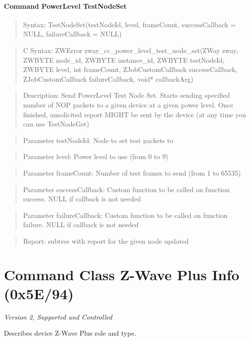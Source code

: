 \paragraph{Command PowerLevel TestNodeSet}
\begin{quote}Syntax: TestNodeSet(testNodeId, level, frameCount, successCallback = NULL, failureCallback = NULL)\end{quote}
\begin{quote}C Syntax: ZWError zway\_cc\_power\_level\_test\_node\_set(ZWay zway, ZWBYTE node\_id, ZWBYTE instance\_id, ZWBYTE testNodeId, ZWBYTE level, int frameCount, ZJobCustomCallback successCallback, ZJobCustomCallback failureCallback, void* callbackArg)\end{quote}
\begin{quote}Description: Send PowerLevel Test Node Set. Starts sending specified number of NOP packets to a given device at a given power level. Once finished, unsolicited report MIGHT be sent by the device (at any time you can use TestNodeGet)\end{quote}
\begin{quote}Parameter testNodeId: Node to set test packets to\end{quote}
\begin{quote}Parameter level: Power level to use (from 0 to 9)\end{quote}
\begin{quote}Parameter frameCount: Number of test frames to send (from 1 to 65535)\end{quote}
\begin{quote}Parameter successCallback: Custom function to be called on function success. NULL if callback is not needed\end{quote}
\begin{quote}Parameter failureCallback: Custom function to be called on function failure. NULL if callback is not needed\end{quote}
\begin{quote}Report: subtree with report for the given node updated\end{quote}


\section{Command Class Z-Wave Plus Info (0x5E/94)}

\textit{Version 2, Supported and Controlled}
\newline

Describes device Z-Wave Plus role and type.
\newline

